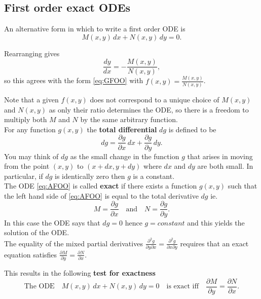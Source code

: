 \subsection{First order exact ODEs}
An alternative form in which to write a first order ODE is
\begin{equation}\label{eq:AFOO}
    M(x,y)\,dx+N(x,y)\,dy=0. \tag{$\star\star$}
\end{equation}

Rearranging gives \[\frac{dy}{dx}=-\frac{M(x,y)}{N(x,y)},\] so this agrees with the form \eqref{eq:GFOO} with $f(x,y)=\frac{M(x,y)}{N(x,y)}$.

Note that a given $f(x,y)$ does not correspond to a unique choice of $M(x,y)$ and $N(x,y)$ as only their ratio determines the ODE, so there is a freedom to multiply both $M$ and $N$ by the same arbitrary function.\\

For any function $g(x,y)$ the \textbf{total differential} $dg$ is defined to be \[dg=\frac{\partial g}{\partial x}\,dx+\frac{\partial g}{\partial y}\,dy.\]
You may think of $dg$ as the small change in the function $g$ that arises in moving from the point $(x,y)$ to $(x+dx,y+dy)$ where $dx$ and $dy$ are both small. In particular, if $dg$ is identically zero then $g$ is a constant.\\

The ODE \eqref{eq:AFOO} is called \textbf{exact} if there exists a function $g(x,y)$ such that the left hand side of \eqref{eq:AFOO} is equal to the total derivative $dg$ ie. \[M=\frac{\partial g}{\partial x} \quad \text{and} \quad N=\frac{\partial g}{\partial y}.\]
In this case the ODE says that $dg=0$ hence $g=constant$ and this yields the solution of the ODE.\\
 
The equality of the mixed partial derivatives $\frac{\partial^2 g}{\partial y\partial x}= \frac{\partial^2 g}{\partial x\partial y}$ requires that an exact equation satisfies $\frac{\partial M}{\partial y}=\frac{\partial N}{\partial x}$.

This results in the following \textbf{test for exactness}
\[
\text{The ODE} \quad M(x,y)\,dx+N(x,y)\,dy=0 \quad \text{is exact iff} \quad \frac{\partial M}{\partial y}=\frac{\partial N}{\partial x}.
\]
\newpage

